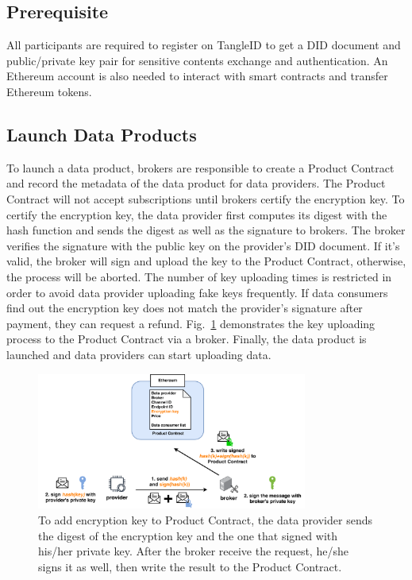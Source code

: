 \documentclass[10pt, conference, compsocconf]{IEEEtran}
\begin{document}
\subsection{Prerequisite}
All participants are required to register on TangleID to get a DID document and public/private key pair for sensitive contents exchange and authentication. An Ethereum account is also needed to interact with smart contracts and transfer Ethereum tokens.

\subsection{Launch Data Products}
To launch a data product, brokers are responsible to create a Product Contract and record the metadata of the data product for data providers. The Product Contract will not accept subscriptions until brokers certify the encryption key. To certify the encryption key, the data provider first computes its digest with the hash function and sends the digest as well as the signature to brokers. The broker verifies the signature with the public key on the provider's DID document. If it's valid, the broker will sign and upload the key to the Product Contract, otherwise, the process will be aborted. The number of key uploading times is restricted in order to avoid data provider uploading fake keys frequently. If data consumers find out the encryption key does not match the provider's signature after payment, they can request a refund. Fig.~\ref{fig:key_upload} demonstrates the key uploading process to the Product Contract via a broker. Finally, the data product is launched and data providers can start uploading data.
\begin{figure}[h]
    \centering
    \includegraphics[width=3.5in]{key_upload}
    \caption{To add encryption key to Product Contract, the data provider sends the digest of the encryption key and the one that signed with his/her private key. After the broker receive the request, he/she signs it as well, then write the result to the Product Contract.}
    \label{fig:key_upload}
\end{figure}
\end{document}
